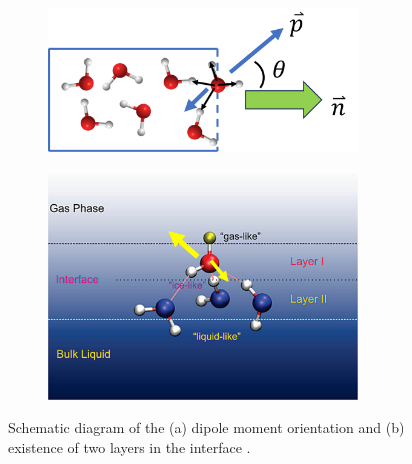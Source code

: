 \begin{figure}[tbhp!]
	\centering
	\begin{subfigure}{0.47\textwidth}
		\centering

		\includegraphics[width=0.9\textwidth]{images/dipole_scheme.png}
		\caption{}
		\label{fig:dipole_scheme}
	\end{subfigure}
	\hfill
	\begin{subfigure}{0.47\textwidth}
		\centering

		\includegraphics[width=0.9\textwidth]{images/dipole_expt.png}
		\caption{}
		\label{fig:dipole_expt}
	\end{subfigure}
	\caption{  Schematic diagram of the (a) dipole moment orientation and
		(b)		existence of two layers in the interface
		\cite{fan2009structure}.}
	\label{fig:dipole_guide}
\end{figure}

